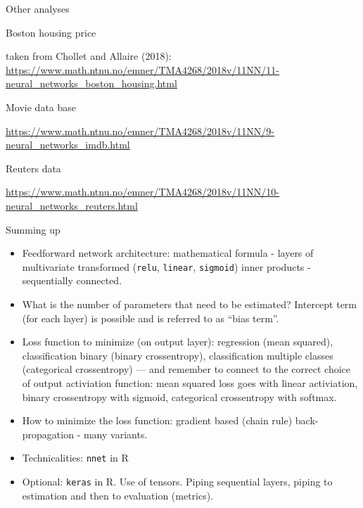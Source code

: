 \documentclass[10pt,ignorenonframetext,]{beamer}
\providecommand{\tightlist}{%
  \setlength{\itemsep}{0pt}\setlength{\parskip}{0pt}}
\begin{document}
\begin{frame}

\begin{block}{Other analyses}

\begin{block}{Boston housing price}

taken from Chollet and Allaire (2018):
\url{https://www.math.ntnu.no/emner/TMA4268/2018v/11NN/11-neural_networks_boston_housing.html}

\end{block}

\begin{block}{Movie data base}

\url{https://www.math.ntnu.no/emner/TMA4268/2018v/11NN/9-neural_networks_imdb.html}

\end{block}

\begin{block}{Reuters data}

\url{https://www.math.ntnu.no/emner/TMA4268/2018v/11NN/10-neural_networks_reuters.html}

\end{block}

\end{block}

\end{frame}

\begin{frame}[fragile]{Summing up}

\begin{itemize}
\tightlist
\item
  Feedforward network architecture: mathematical formula - layers of
  multivariate transformed (\texttt{relu}, \texttt{linear},
  \texttt{sigmoid}) inner products - sequentially connected.
\item
  What is the number of parameters that need to be estimated? Intercept
  term (for each layer) is possible and is referred to as ``bias term''.
\item
  Loss function to minimize (on output layer): regression (mean
  squared), classification binary (binary crossentropy), classification
  multiple classes (categorical crossentropy) --- and remember to
  connect to the correct choice of output activiation function: mean
  squared loss goes with linear activiation, binary crossentropy with
  sigmoid, categorical crossentropy with softmax.
\item
  How to minimize the loss function: gradient based (chain rule)
  back-propagation - many variants.
\item
  Technicalities: \texttt{nnet} in R
\item
  Optional: \texttt{keras} in R. Use of tensors. Piping sequential
  layers, piping to estimation and then to evaluation (metrics).
\end{itemize}

\end{frame}
\end{document}
